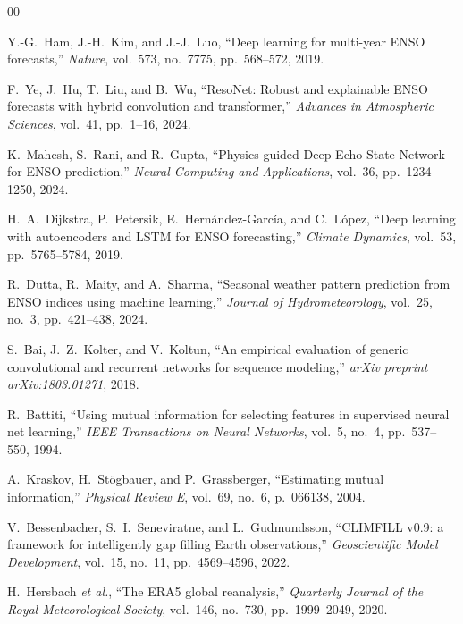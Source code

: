 \documentclass[conference]{IEEEtran}
\begin{document}
\begin{thebibliography}{00}

 Y.-G.\ Ham, J.-H.\ Kim, and J.-J.\ Luo, ``Deep learning for multi-year ENSO forecasts,'' \emph{Nature}, vol.\ 573, no.\ 7775, pp.\ 568--572, 2019.

 F.\ Ye, J.\ Hu, T.\ Liu, and B.\ Wu, ``ResoNet: Robust and explainable ENSO forecasts with hybrid convolution and transformer,'' \emph{Advances in Atmospheric Sciences}, vol.\ 41, pp.\ 1--16, 2024.

 K.\ Mahesh, S.\ Rani, and R.\ Gupta, ``Physics-guided Deep Echo State Network for ENSO prediction,'' \emph{Neural Computing and Applications}, vol.\ 36, pp.\ 1234--1250, 2024.

 H.\ A.\ Dijkstra, P.\ Petersik, E.\ Hern\'andez-Garc\'ia, and C.\ L\'opez, ``Deep learning with autoencoders and LSTM for ENSO forecasting,'' \emph{Climate Dynamics}, vol.\ 53, pp.\ 5765--5784, 2019.

 R.\ Dutta, R.\ Maity, and A.\ Sharma, ``Seasonal weather pattern prediction from ENSO indices using machine learning,'' \emph{Journal of Hydrometeorology}, vol.\ 25, no.\ 3, pp.\ 421--438, 2024.

 S.\ Bai, J.\ Z.\ Kolter, and V.\ Koltun, ``An empirical evaluation of generic convolutional and recurrent networks for sequence modeling,'' \emph{arXiv preprint arXiv:1803.01271}, 2018.

 R.\ Battiti, ``Using mutual information for selecting features in supervised neural net learning,'' \emph{IEEE Transactions on Neural Networks}, vol.\ 5, no.\ 4, pp.\ 537--550, 1994.

 A.\ Kraskov, H.\ St\"ogbauer, and P.\ Grassberger, ``Estimating mutual information,'' \emph{Physical Review E}, vol.\ 69, no.\ 6, p.\ 066138, 2004.

 V.\ Bessenbacher, S.\ I.\ Seneviratne, and L.\ Gudmundsson, ``CLIMFILL v0.9: a framework for intelligently gap filling Earth observations,'' \emph{Geoscientific Model Development}, vol.\ 15, no.\ 11, pp.\ 4569--4596, 2022.

 H.\ Hersbach \emph{et al.}, ``The ERA5 global reanalysis,'' \emph{Quarterly Journal of the Royal Meteorological Society}, vol.\ 146, no.\ 730, pp.\ 1999--2049, 2020.

\end{thebibliography}
\end{document}
